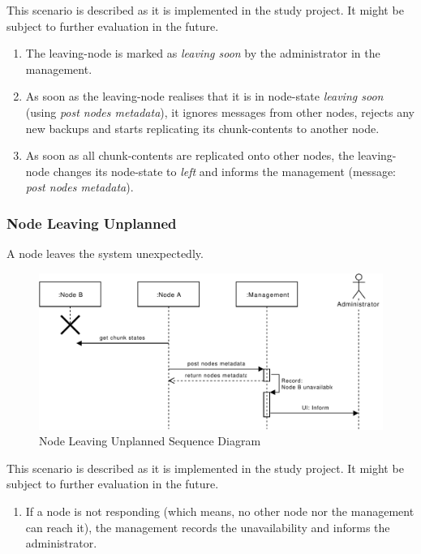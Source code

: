 This scenario is described as it is implemented in the study project. It might be subject to further evaluation in the future.

\begin{enumerate}
    \item The \gls{leaving-node} is marked as \emph{leaving soon} by the \gls{administrator} in the \gls{management}.
    \item As soon as the \gls{leaving-node} realises that it is in \gls{node-state} \emph{leaving soon} (using \emph{post nodes metadata}), it ignores messages from other \glspl{node}, rejects any new backups and starts replicating its \glspl{chunk-content} to another \gls{node}.
    \item As soon as all \glspl{chunk-content} are replicated onto other \glspl{node}, the \gls{leaving-node} changes its \gls{node-state} to \emph{left} and informs the \gls{management} (message: \emph{post nodes metadata}).
\end{enumerate}

\subsubsection{Node Leaving Unplanned}\label{sec:scenario-node-leave-unplanned}
A \gls{node} leaves the system unexpectedly.

\begin{figure}[h]
    \centering
    \includegraphics[width=\linewidth]{resources/node_leaving_unplanned.pdf}
    \caption{Node Leaving Unplanned Sequence Diagram}
    \label{fig:node-leave-unplanned}
\end{figure}

This scenario is described as it is implemented in the study project. It might be subject to further evaluation in the future.

\begin{enumerate}
    \item If a \gls{node} is not responding (which means, no other \gls{node} nor the \gls{management} can reach it), the \gls{management} records the unavailability and informs the \gls{administrator}.
\end{enumerate}

